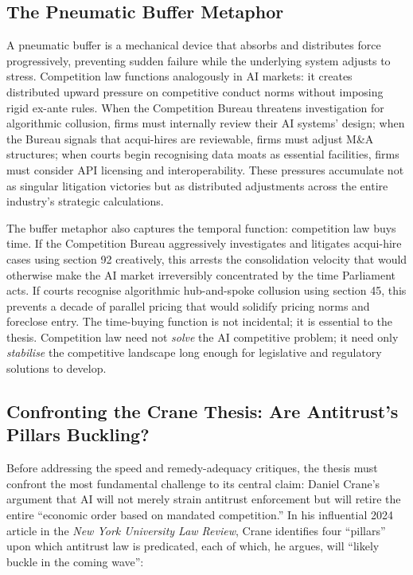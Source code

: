 \subsection{The Pneumatic Buffer Metaphor}

A pneumatic buffer is a mechanical device that absorbs and distributes force progressively, preventing sudden failure while the underlying system adjusts to stress. Competition law functions analogously in AI markets: it creates distributed upward pressure on competitive conduct norms without imposing rigid ex-ante rules. When the Competition Bureau threatens investigation for algorithmic collusion, firms must internally review their AI systems' design; when the Bureau signals that acqui-hires are reviewable, firms must adjust M\&A structures; when courts begin recognising data moats as essential facilities, firms must consider API licensing and interoperability. These pressures accumulate not as singular litigation victories but as distributed adjustments across the entire industry's strategic calculations.

The buffer metaphor also captures the temporal function: competition law buys time. If the Competition Bureau aggressively investigates and litigates acqui-hire cases using section 92 creatively, this arrests the consolidation velocity that would otherwise make the AI market irreversibly concentrated by the time Parliament acts. If courts recognise algorithmic hub-and-spoke collusion using section 45, this prevents a decade of parallel pricing that would solidify pricing norms and foreclose entry. The time-buying function is not incidental; it is essential to the thesis. Competition law need not \textit{solve} the AI competitive problem; it need only \textit{stabilise} the competitive landscape long enough for legislative and regulatory solutions to develop.

\subsection{Confronting the Crane Thesis: Are Antitrust's Pillars Buckling?}

Before addressing the speed and remedy-adequacy critiques, the thesis must confront the most fundamental challenge to its central claim: Daniel Crane's argument that AI will not merely strain antitrust enforcement but will retire the entire ``economic order based on mandated competition.'' In his influential 2024 article in the \textit{New York University Law Review}, Crane identifies four ``pillars'' upon which antitrust law is predicated, each of which, he argues, will ``likely buckle in the coming wave'':

